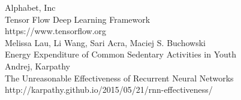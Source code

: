 \documentclass[10pt, titlepage, twocolumn]{article}
\begin{document}
\begin{thebibliography}{9}
 Alphabet, Inc \\
Tensor Flow Deep Learning Framework \\
https://www.tensorflow.org \\

 Melissa Lau, Li Wang, Sari Acra, Maciej S. Buchowski \\
Energy Expenditure of Common Sedentary Activities in Youth \\

 Andrej, Karpathy \\
The Unreasonable Effectiveness of Recurrent Neural Networks \\
http://karpathy.github.io/2015/05/21/rnn-effectiveness/

\end{thebibliography}
\end{document}
